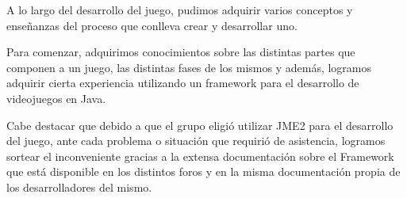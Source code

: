 \documentclass[a4paper,11pt]{article}
\begin{document}
A lo largo del desarrollo del juego, pudimos adquirir varios conceptos y
enseñanzas del proceso que conlleva crear y desarrollar uno.

Para comenzar, adquirimos conocimientos sobre las distintas partes que componen
a un juego, las distintas fases de los mismos y además, logramos adquirir
cierta experiencia utilizando un framework para el desarrollo de videojuegos en
Java.

Cabe destacar que debido a que el grupo eligió utilizar JME2 para el desarrollo
del juego, ante cada problema o situación que requirió de asistencia, logramos
sortear el inconveniente gracias a la extensa documentación sobre el Framework
que está disponible en los distintos foros y en la misma documentación propia
de los desarrolladores del mismo.
\end{document}
